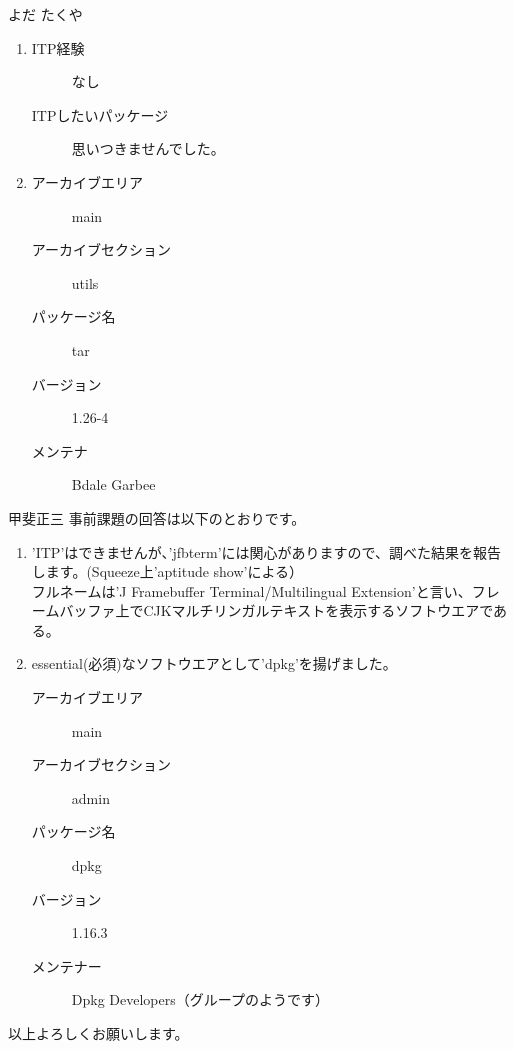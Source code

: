 \documentclass[mingoth,a4paper]{jsarticle}
\begin{document}
\begin{prework}{ よだ たくや }
  \begin{enumerate}
  \item
    \begin{description}
    \item [ITP経験] なし
    \item [ITPしたいパッケージ] 思いつきませんでした。
    \end{description}
  \item 
    \begin{description}
    \item [アーカイブエリア] main
    \item [アーカイブセクション] utils
    \item [パッケージ名] tar
    \item [バージョン] 1.26-4
    \item [メンテナ] Bdale Garbee
    \end{description}
  \end{enumerate}
\end{prework}

\begin{prework}{ 甲斐正三 }
  事前課題の回答は以下のとおりです。
  \begin{enumerate}
  \item 
    'ITP'はできませんが、'jfbterm'には関心がありますので、調べた結果を報告します。(Squeeze上'aptitude show'による）\\
    フルネームは'J Framebuffer Terminal/Multilingual Extension'と言い、フレームバッファ上でCJKマルチリンガルテキストを表示するソフトウエアである。
    \item essential(必須)なソフトウエアとして'dpkg'を揚げました。
      \begin{description}
      \item [アーカイブエリア] main
      \item [アーカイブセクション] admin
      \item [パッケージ名] dpkg
      \item [バージョン] 1.16.3
      \item [メンテナー] Dpkg Developers（グループのようです）
      \end{description}
  \end{enumerate}
  以上よろしくお願いします。
\end{prework}
\end{document}
